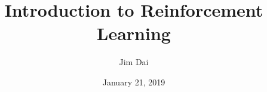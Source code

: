 \documentclass{beamer}
\title{Introduction to Reinforcement Learning}
\author{Jim Dai }
\institute{iDDA, CUHK-Shenzhen}
\date{January 21, 2019}
\def\E{{\mathbb E}}
\begin{document}
\footnotesize



\maketitle













\end{document}

